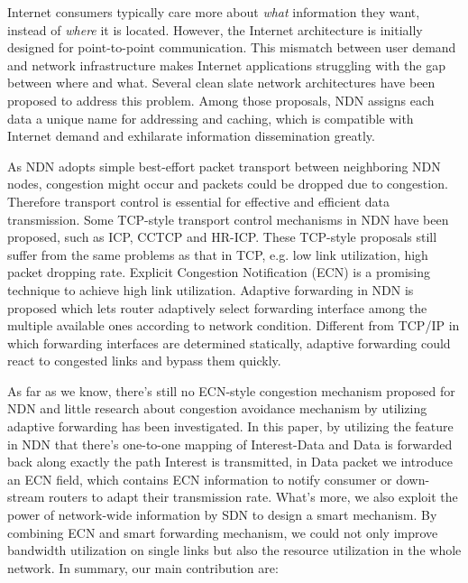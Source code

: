 
Internet consumers typically care more about \emph{what} information they want, instead of \emph{where} it is located. However, the Internet architecture is initially designed for point-to-point communication. This mismatch between user demand and network infrastructure makes Internet applications struggling with the gap between where and what. Several clean slate network architectures have been proposed to address this problem. Among those proposals, NDN\cite{NDN} assigns each data a unique name for addressing and caching, which is compatible with Internet demand and exhilarate information dissemination greatly. 

As NDN adopts simple best-effort packet transport between neighboring NDN nodes, congestion might occur and packets could be dropped due to congestion. Therefore transport control is essential for effective and efficient data transmission. Some TCP-style transport control mechanisms in NDN have been proposed, such as ICP\cite{ICP}, CCTCP\cite{CCTCP} and HR-ICP\cite{shape}. These TCP-style proposals still suffer from the same problems as that in TCP, e.g. low link utilization, high packet dropping rate. Explicit Congestion Notification (ECN) is a promising technique to achieve high link utilization\cite{XCP}. Adaptive forwarding\cite{Adaptive} in NDN is proposed which lets router adaptively select forwarding interface among the multiple available ones according to network condition. Different from TCP/IP in which forwarding interfaces are determined statically, adaptive forwarding could react to congested links and bypass them quickly.

As far as we know, there's still no ECN-style congestion mechanism proposed for NDN and little research about congestion avoidance mechanism by utilizing adaptive forwarding has been investigated. In this paper, by utilizing the feature in NDN that there's one-to-one mapping of Interest-Data and Data is forwarded back along exactly the path Interest is transmitted, in Data packet we introduce an ECN field, which contains ECN information to notify consumer or down-stream routers to adapt their transmission rate. What's more, we also exploit the power of network-wide information by SDN\cite{SDN} to design a smart  mechanism. By combining ECN and smart forwarding mechanism, we could not only improve bandwidth utilization on single links but also the resource utilization in the whole network. In summary, our main contribution are:

